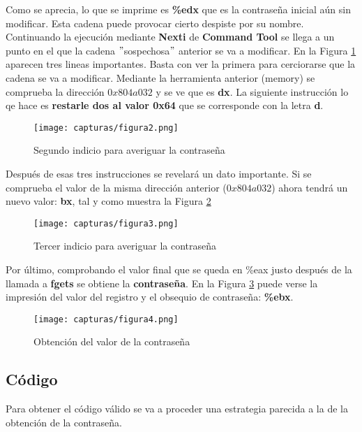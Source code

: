 	Como se aprecia, lo que se imprime es \textbf{\%edx} que es la contraseña inicial aún sin modificar. Esta cadena puede provocar cierto despiste por su nombre.
	\\
	
	Continuando la ejecución mediante \textbf{Nexti} de \textbf{Command Tool} se llega a un punto en el que la cadena $ " $sospechosa$ " $ anterior se va a modificar. En la Figura \ref{fig:figura2} aparecen tres lineas importantes. Basta con ver la primera para cerciorarse que la cadena se va a modificar. Mediante la herramienta anterior (memory) se comprueba la dirección
	\textbf{$ 0x804a032 $} y se ve que es \textbf{dx}. La siguiente instrucción lo qe hace es \textbf{restarle dos al valor 0x64} que se corresponde con la letra \textbf{d}.
	
	\begin{figure}[H] %
		\centering
		\texttt{[image: capturas/figura2.png]} 
		\caption{Segundo indicio para averiguar la contraseña} 
		\label{fig:figura2}
	\end{figure}

	Después de esas tres instrucciones se revelará un dato importante.
	Si se comprueba el valor de la misma dirección anterior (\textbf{$ 0x804a032 $}) ahora tendrá un nuevo valor: \textbf{bx}, tal y como muestra la Figura \ref{fig:figura3}
	
	\begin{figure}[H] %
		\centering
		\texttt{[image: capturas/figura3.png]} 
		\caption{Tercer indicio para averiguar la contraseña} 
		\label{fig:figura3}
	\end{figure}
	
	Por último, comprobando el valor final que se queda en \%eax justo después de la llamada a \textbf{fgets} se obtiene la \textbf{contraseña}. En la Figura \ref{fig:figura4} puede verse la impresión del valor del registro y el obsequio de contraseña: \textbf{\%ebx}.
	
	\begin{figure}[H] %
		\centering
		\texttt{[image: capturas/figura4.png]} 
		\caption{Obtención del valor de la contraseña} 
		\label{fig:figura4}
	\end{figure}

\newpage

\subsection{Código}
	Para obtener el código válido se va a proceder una estrategia parecida a la de la obtención de la contraseña.
	
